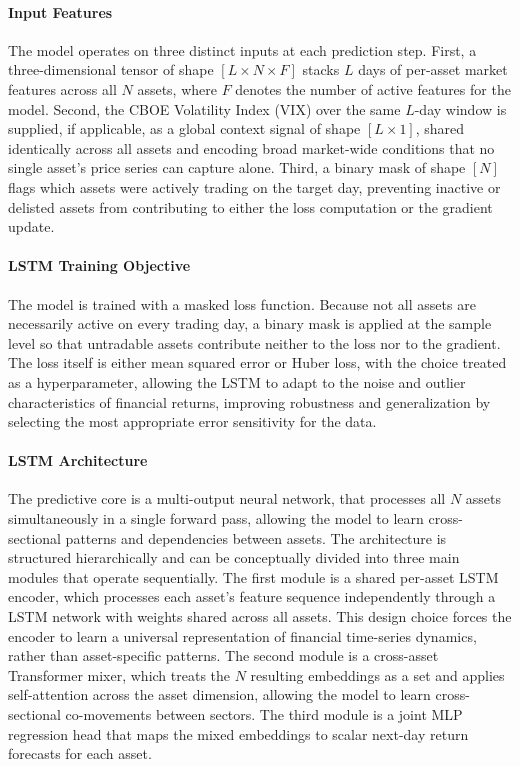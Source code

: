 \paragraph{Input Features} The model operates on three distinct inputs at each prediction step. First, a three-dimensional tensor of shape $[L \times N \times F]$ stacks $L$ days of per-asset market features across all $N$ assets, where $F$ denotes the number of active features for the model. Second, the CBOE Volatility Index (VIX) over the same $L$-day window is supplied, if applicable, as a global context signal of shape $[L \times 1]$, shared identically across all assets and encoding broad market-wide conditions that no single asset's price series can capture alone. Third, a binary mask of shape $[N]$ flags which assets were actively trading on the target day, preventing inactive or delisted assets from contributing to either the loss computation or the gradient update.

\paragraph{LSTM Training Objective} The model is trained with a masked loss function. Because not all assets are necessarily active on every trading day, a binary mask is applied at the sample level so that untradable assets contribute neither to the loss nor to the gradient. The loss itself is either mean squared error or Huber loss, with the choice treated as a hyperparameter, allowing the LSTM to adapt to the noise and outlier characteristics of financial returns, improving robustness and generalization by selecting the most appropriate error sensitivity for the data.

\paragraph{LSTM Architecture} The predictive core is a multi-output neural network, that processes all $N$ assets simultaneously in a single forward pass, allowing the model to learn cross-sectional patterns and dependencies between assets. The architecture is structured hierarchically and can be conceptually divided into three main modules that operate sequentially. The first module is a shared per-asset LSTM encoder, which processes each asset's feature sequence independently through a LSTM network with weights shared across all assets. This design choice forces the encoder to learn a universal representation of financial time-series dynamics, rather than asset-specific patterns. The second module is a cross-asset Transformer mixer, which treats the $N$ resulting embeddings as a set and applies self-attention across the asset dimension, allowing the model to learn cross-sectional co-movements between sectors. The third module is a joint MLP regression head that maps the mixed embeddings to scalar next-day return forecasts for each asset.

